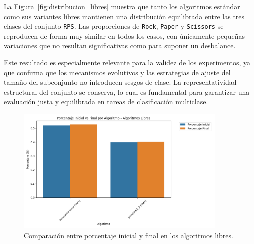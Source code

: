 La Figura~\ref{fig:distribucion_libres} muestra que tanto los algoritmos estándar como sus variantes libres
mantienen una distribución equilibrada entre las tres clases del conjunto \texttt{RPS}.
Las proporciones de \texttt{Rock}, \texttt{Paper} y \texttt{Scissors} se reproducen de forma muy similar en todos los casos,
con únicamente pequeñas variaciones que no resultan significativas como para suponer un desbalance.

Este resultado es especialmente relevante para la validez de los experimentos, ya que confirma que los mecanismos evolutivos
y las estrategias de ajuste del tamaño del subconjunto no introducen sesgos de clase.
La representatividad estructural del conjunto se conserva, lo cual es fundamental para garantizar una evaluación justa y equilibrada en tareas de clasificación multiclase.


\begin{figure}[htp]
    \centering
    \includegraphics[width=0.9\textwidth]{imagenes/evaluaciones/libres/porcentaje-inical-vs-final-por-algoritmo}
    \caption{Comparación entre porcentaje inicial y final en los algoritmos libres.}
    \label{fig:porcentaje_libres_1}
\end{figure}

